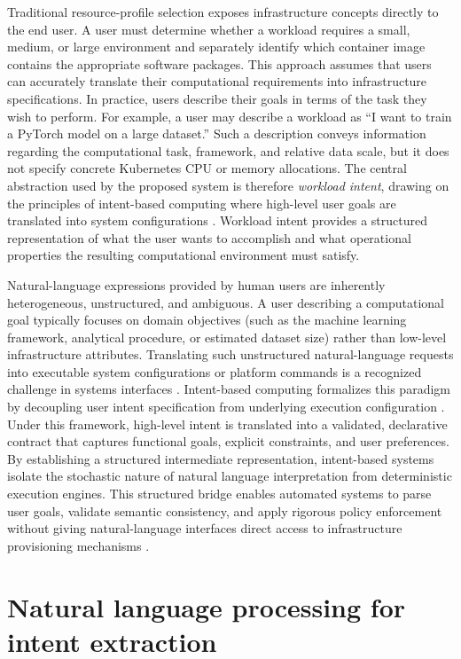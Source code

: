 Traditional resource-profile selection exposes infrastructure concepts directly to the end user. A user must determine whether a workload requires a small, medium, or large environment and separately identify which container image contains the appropriate software packages. This approach assumes that users can accurately translate their computational requirements into infrastructure specifications. In practice, users describe their goals in terms of the task they wish to perform. For example, a user may describe a workload as ``I want to train a PyTorch model on a large dataset.'' Such a description conveys information regarding the computational task, framework, and relative data scale, but it does not specify concrete Kubernetes CPU or memory allocations. The central abstraction used by the proposed system is therefore \emph{workload intent}, drawing on the principles of intent-based computing where high-level user goals are translated into system configurations \cite{rfc9315,leivadeas,wu}. Workload intent provides a structured representation of what the user wants to accomplish and what operational properties the resulting computational environment must satisfy.

Natural-language expressions provided by human users are inherently heterogeneous, unstructured, and ambiguous. A user describing a computational goal typically focuses on domain objectives (such as the machine learning framework, analytical procedure, or estimated dataset size) rather than low-level infrastructure attributes. Translating such unstructured natural-language requests into executable system configurations or platform commands is a recognized challenge in systems interfaces \cite{nl2bash}. Intent-based computing formalizes this paradigm by decoupling user intent specification from underlying execution configuration \cite{rfc9315,leivadeas}. Under this framework, high-level intent is translated into a validated, declarative contract that captures functional goals, explicit constraints, and user preferences. By establishing a structured intermediate representation, intent-based systems isolate the stochastic nature of natural language interpretation from deterministic execution engines. This structured bridge enables automated systems to parse user goals, validate semantic consistency, and apply rigorous policy enforcement without giving natural-language interfaces direct access to infrastructure provisioning mechanisms \cite{wu}.

\section{Natural language processing for intent extraction}
\label{sec:nlp_background}

